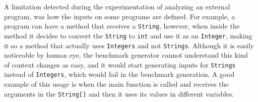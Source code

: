 A limitation detected during the experimentation of analyzing an external program, was how the inputs on some programs are defined. For example, a program can have a method that receives a \texttt{String}, however, when inside the method it decides to convert the \texttt{String} to \texttt{int} and use it as an \texttt{Integer}, making it so a method that actually uses \texttt{Integers} and not \texttt{Strings}. Although it is easily noticeable by human eye, the benchmark generator cannot understand this kind of context changes as easy, and it would start generating inputs for \texttt{Strings} instead of \texttt{Integers}, which would fail in the benchmark generation. A good example of this usage is when the main function is called and receives the arguments in the \texttt{String[]} and then it uses its values in different variables.
